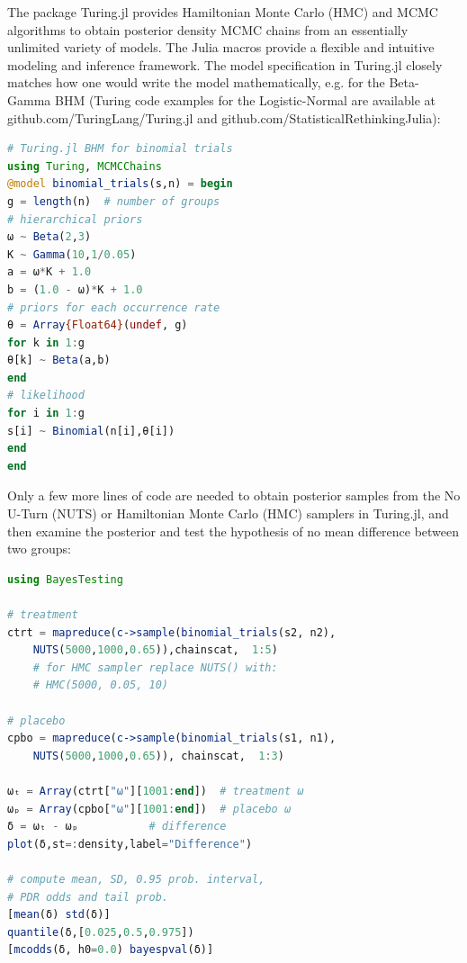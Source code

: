 \documentclass{juliacon}
\begin{document}
\vskip 6pt
The package Turing.jl provides Hamiltonian Monte Carlo (HMC) and MCMC algorithms to obtain posterior density MCMC chains from an essentially unlimited variety of models. The Julia macros provide a flexible and intuitive modeling and inference framework. The model specification in Turing.jl closely matches how one would write the model mathematically, e.g. for the Beta-Gamma BHM (Turing code examples for the Logistic-Normal are available at github.com/TuringLang/Turing.jl and github.com/StatisticalRethinkingJulia):
\begin{lstlisting}[language = Julia]
# Turing.jl BHM for binomial trials
using Turing, MCMCChains
@model binomial_trials(s,n) = begin
g = length(n)  # number of groups
# hierarchical priors
ω ~ Beta(2,3)
K ~ Gamma(10,1/0.05)
a = ω*K + 1.0
b = (1.0 - ω)*K + 1.0
# priors for each occurrence rate
θ = Array{Float64}(undef, g)
for k in 1:g
θ[k] ~ Beta(a,b)
end
# likelihood
for i in 1:g
s[i] ~ Binomial(n[i],θ[i])
end
end
\end{lstlisting}

Only a few more lines of code are needed to obtain posterior samples from the No U-Turn (NUTS) or Hamiltonian Monte Carlo (HMC) samplers in Turing.jl, and then examine the posterior and test the hypothesis of no mean difference between two groups:
\begin{lstlisting}[language = Julia]
using BayesTesting

# treatment
ctrt = mapreduce(c->sample(binomial_trials(s2, n2),
	NUTS(5000,1000,0.65)),chainscat,  1:5)
	# for HMC sampler replace NUTS() with: 
	# HMC(5000, 0.05, 10)

# placebo
cpbo = mapreduce(c->sample(binomial_trials(s1, n1),
	NUTS(5000,1000,0.65)), chainscat,  1:3)

ωₜ = Array(ctrt["ω"][1001:end])  # treatment ω
ωₚ = Array(cpbo["ω"][1001:end])  # placebo ω
δ = ωₜ - ωₚ           # difference
plot(δ,st=:density,label="Difference")

# compute mean, SD, 0.95 prob. interval,
# PDR odds and tail prob.
[mean(δ) std(δ)]
quantile(δ,[0.025,0.5,0.975])
[mcodds(δ, h0=0.0) bayespval(δ)]
\end{lstlisting}
\end{document}
